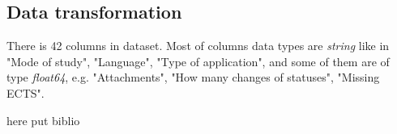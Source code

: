 \documentclass[conference]{IEEEtran}
\begin{document}
\subsection{Data transformation}
There is 42 columns in dataset. Most of columns data types are \textit{string} like in "Mode of study", "Language", "Type of application", and some of them are of type \textit{float64}, e.g. "Attachments", "How many changes of statuses", "Missing ECTS".




\begin{thebibliography}{00}
 here put  biblio

\end{thebibliography}
\end{document}
